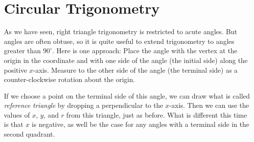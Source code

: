 \newpage 

\section{Circular Trigonometry}
As we have seen, right triangle trigonometry is restricted to acute angles.  But angles are often obtuse, so it is quite useful to extend trigonometry to angles greater than $90^\circ$.  Here is one approach:  Place the angle with the vertex at the origin in the coordinate and with one side of the angle (the initial side) along the positive $x$-axis.  
Measure to the other side of the angle (the terminal side) as a counter-clockwise rotation about the origin.   


If we choose a point on the terminal side of this angle, we can draw what is called \emph{reference triangle} by dropping a perpendicular to the $x$-axis.  Then we can use the values of $x$, $y$, and $r$ from this triangle, just as before.  What is different this time is that $x$ is negative, as well be the case for any angles with a terminal side in the second quadrant.  


